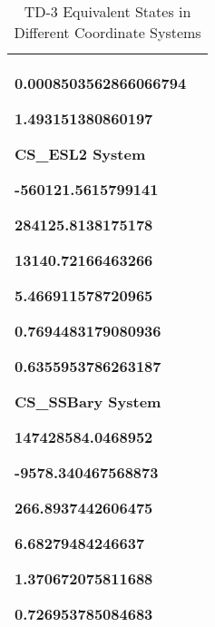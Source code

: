 \begin{table}[htbp!]
\begin{tabular}{|p{1.0 in} |p{5.0 in} |}
\begin{compactenum}
\begin{compactenum}
                     \item 0.0008503562866066794
                     \item 1.493151380860197
               \end{compactenum}
               \item    CS\_ESL2 System
                \begin{compactenum}
                     \item -560121.5615799141
                     \item 284125.8138175178
                     \item 13140.72166463266
                     \item 5.466911578720965
                     \item 0.7694483179080936
                     \item 0.6355953786263187
                \end{compactenum}
               \item   CS\_SSBary System
                 \begin{compactenum}
                     \item 147428584.0468952
                     \item -9578.340467568873
                     \item 266.8937442606475
                     \item 6.68279484246637
                     \item 1.370672075811688
                     \item 0.726953785084683
                 \end{compactenum}
          \end{compactenum}
         \\ \hline
\end{tabular}
   \label{Table:TD-3}
   \caption{TD-3 Equivalent States in Different Coordinate Systems}
\end{table} 